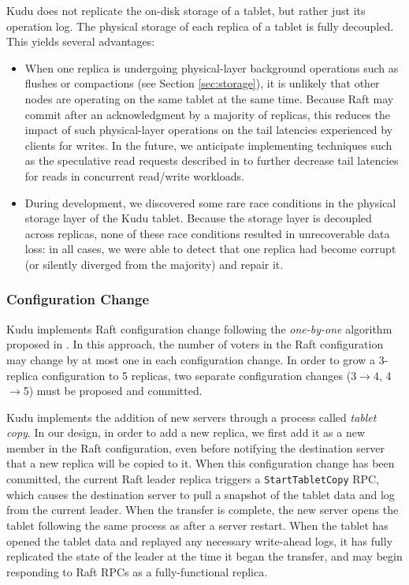 \documentclass[twocolumn,9pt]{article}
\begin{document}
Kudu does not replicate the on-disk storage of a tablet, but rather just
its operation log. The physical storage of each replica of a tablet is fully decoupled.
This yields several advantages:

\begin{itemize}

\item When one replica is undergoing physical-layer background operations such as flushes or compactions
(see Section \ref{sec:storage}), it is unlikely that other nodes are operating on the same tablet at the same time. Because
Raft may commit after an acknowledgment by a majority of replicas, this reduces the impact
of such physical-layer operations on the tail latencies experienced by clients for writes.
In the future, we anticipate implementing techniques such as the speculative read requests
described in \cite{tail_at_scale} to further decrease tail latencies for reads in concurrent read/write
workloads.

\item During development, we discovered some rare race conditions in the physical storage
layer of the Kudu tablet. Because the storage layer is decoupled across replicas, none of these
race conditions resulted in unrecoverable data loss: in all cases, we were able to detect that one
replica had become corrupt (or silently diverged from the majority) and repair it.
\end{itemize}

\subsubsection{Configuration Change}

Kudu implements Raft configuration change following the {\em one-by-one} algorithm proposed in
\cite{diego_thesis}. In this approach, the number of voters in the Raft configuration may change
by at most one in each configuration change. In order to grow a 3-replica configuration to 5
replicas, two separate configuration changes (3$\rightarrow$4, 4$\rightarrow$5) must be proposed
and committed.

Kudu implements the addition of new servers through a process called {\em tablet copy}.
In our design, in order to add a new replica, we first add it as a new member in the
Raft configuration, even before notifying the destination server that a new replica will
be copied to it. When this configuration change has been committed, the current Raft leader
replica triggers a {\tt StartTabletCopy} RPC, which causes the destination server to pull a
snapshot of the tablet data and log from the current leader. When the transfer
is complete, the new server opens the tablet following the same process as after
a server restart. When the tablet has opened the tablet data and replayed any necessary
write-ahead logs, it has fully replicated the state of the leader at the time it began the transfer,
and may begin responding to Raft RPCs as a fully-functional replica.
\end{document}
